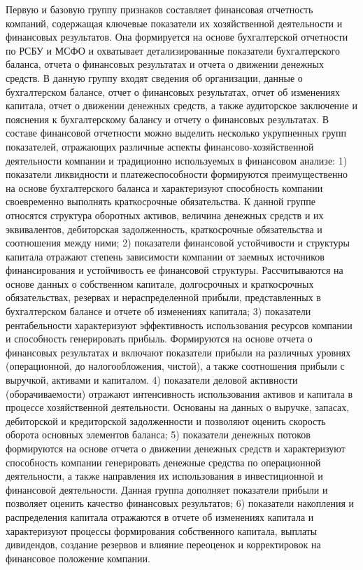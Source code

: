 \documentclass[
]{article}
\begin{document}
Первую и базовую группу признаков составляет финансовая отчетность компаний, содержащая ключевые показатели их хозяйственной деятельности и финансовых результатов. Она формируется на основе бухгалтерской отчетности по РСБУ и МСФО и охватывает детализированные показатели бухгалтерского баланса, отчета о финансовых результатах и отчета о движении денежных средств. В данную группу входят сведения об организации, данные о бухгалтерском балансе, отчет о финансовых результатах, отчет об изменениях капитала, отчет о движении денежных средств, а также аудиторское заключение и пояснения к бухгалтерскому балансу и отчету о финансовых результатах. В составе финансовой отчетности можно выделить несколько укрупненных групп показателей, отражающих различные аспекты финансово-хозяйственной деятельности компании и традиционно используемых в финансовом анализе: 1) показатели ликвидности и платежеспособности формируются преимущественно на основе бухгалтерского баланса и характеризуют способность компании своевременно выполнять краткосрочные обязательства. К данной группе относятся структура оборотных активов, величина денежных средств и их эквивалентов, дебиторская задолженность, краткосрочные обязательства и соотношения между ними; 2) показатели финансовой устойчивости и структуры капитала отражают степень зависимости компании от заемных источников финансирования и устойчивость ее финансовой структуры. Рассчитываются на основе данных о собственном капитале, долгосрочных и краткосрочных обязательствах, резервах и нераспределенной прибыли, представленных в бухгалтерском балансе и отчете об изменениях капитала; 3) показатели рентабельности характеризуют эффективность использования ресурсов компании и способность генерировать прибыль. Формируются на основе отчета о финансовых результатах и включают показатели прибыли на различных уровнях (операционной, до налогообложения, чистой), а также соотношения прибыли с выручкой, активами и капиталом. 4) показатели деловой активности (оборачиваемости) отражают интенсивность использования активов и капитала в процессе хозяйственной деятельности. Основаны на данных о выручке, запасах, дебиторской и кредиторской задолженности и позволяют оценить скорость оборота основных элементов баланса; 5) показатели денежных потоков формируются на основе отчета о движении денежных средств и характеризуют способность компании генерировать денежные средства по операционной деятельности, а также направления их использования в инвестиционной и финансовой деятельности. Данная группа дополняет показатели прибыли и позволяет оценить качество финансовых результатов; 6) показатели накопления и распределения капитала отражаются в отчете об изменениях капитала и характеризуют процессы формирования собственного капитала, выплаты дивидендов, создание резервов и влияние переоценок и корректировок на финансовое положение компании.
\end{document}
